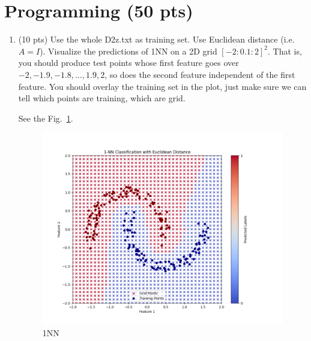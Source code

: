 \documentclass[a4paper]{article}
\theoremstyle{definition}
\newenvironment{soln}{
    \leavevmode\color{blue}\ignorespaces
}{}
\begin{document}
\section{Programming (50 pts)}
\begin{enumerate}
	\item (10 pts) Use the whole D2z.txt as training set.  Use Euclidean distance (i.e. $A=I$).
	Visualize the predictions of 1NN on a 2D grid $[-2:0.1:2]^2$.
	That is, you should produce test points whose first feature goes over $-2, -1.9, -1.8, \ldots, 1.9, 2$, so does the second feature independent of the first feature.
	You should overlay the training set in the plot, just make sure we can tell which points are training, which are grid.
	
	\begin{soln}
	See the Fig.~\ref{fig:1nn}.
	\begin{figure}
		\centering
		\includegraphics[width=0.5\linewidth]{images/D2zSplitPlot.png}
		\caption{1NN}
		\label{fig:1nn}
	\end{figure}
	\end{soln}
	
	

\end{enumerate}
\end{document}
